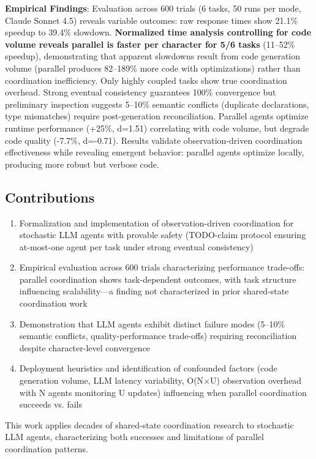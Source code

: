 \documentclass{article}
\begin{document}
\textbf{Empirical Findings}: Evaluation across 600 trials (6 tasks, 50 runs per mode, Claude Sonnet 4.5) reveals variable outcomes: raw response times show 21.1\% speedup to 39.4\% slowdown. \textbf{Normalized time analysis controlling for code volume reveals parallel is faster per character for 5/6 tasks} (11--52\% speedup), demonstrating that apparent slowdowns result from code generation volume (parallel produces 82--189\% more code with optimizations) rather than coordination inefficiency. Only highly coupled tasks show true coordination overhead. Strong eventual consistency guarantees 100\% convergence but preliminary inspection suggests 5--10\% semantic conflicts (duplicate declarations, type mismatches) require post-generation reconciliation. Parallel agents optimize runtime performance (+25\%, d=1.51) correlating with code volume, but degrade code quality (-7.7\%, d=-0.71). Results validate observation-driven coordination effectiveness while revealing emergent behavior: parallel agents optimize locally, producing more robust but verbose code.

\subsection{Contributions}

\begin{enumerate}
\item Formalization and implementation of observation-driven coordination for stochastic LLM agents with provable safety (TODO-claim protocol ensuring at-most-one agent per task under strong eventual consistency)
\item Empirical evaluation across 600 trials characterizing performance trade-offs: parallel coordination shows task-dependent outcomes, with task structure influencing scalability---a finding not characterized in prior shared-state coordination work
\item Demonstration that LLM agents exhibit distinct failure modes (5--10\% semantic conflicts, quality-performance trade-offs) requiring reconciliation despite character-level convergence
\item Deployment heuristics and identification of confounded factors (code generation volume, LLM latency variability, O(N$\times$U) observation overhead with N agents monitoring U updates) influencing when parallel coordination succeeds vs. fails
\end{enumerate}

This work applies decades of shared-state coordination research to stochastic LLM agents, characterizing both successes and limitations of parallel coordination patterns.
\end{document}
